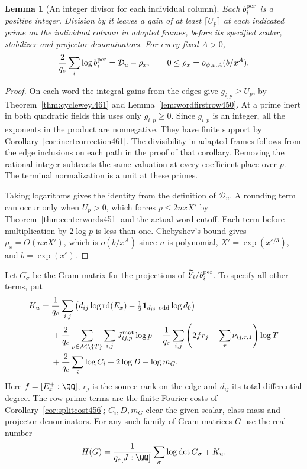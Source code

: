 \documentclass[a4paper,11pt]{article}
\newtheorem{lemma}[proposition]{Lemma}
\theoremstyle{definition}
\theoremstyle{remark}
\numberwithin{equation}{section}
\begin{document}
\begin{lemma}[An integer divisor for each individual column]\leavevmode
\label{lem:periodinteger463}
Each \(b_i^{\rm per}\) is a positive integer. Division by it
leaves a gain of at least \(\lceil U_p\rceil\) at each indicated
prime on the individual column in adapted frames, before its
specified scalar, stabilizer and projector denominators.
For every fixed \(A>0\),
\[
       \frac2{q_c}\sum_i\log b_i^{\rm per}
                    =\mathcal D_u-\rho_x,\qquad
       0\le\rho_x=o_{\psi,\varepsilon,A}(b/x^A).
\]
\end{lemma}
\begin{proof}
On each word the integral gains from the edges give
\(g_{i,p}\ge U_p\), by
Theorem~\ref{thm:cycleweyl461} and
Lemma~\ref{lem:wordfirstrow450}. At a prime inert in both
quadratic fields this uses only \(g_{i,p}\ge0\). Since
\(g_{i,p}\) is an integer, all the exponents in the product
are nonnegative. They have finite support by
Corollary~\ref{cor:inertcorrection461}. The divisibility in
adapted frames follows from the edge inclusions on each path
in the proof of that corollary. Removing the rational integer
subtracts the same valuation at every coefficient place over
\(p\). The terminal normalization is a unit at these primes.

Taking logarithms gives the identity from the definition of
\(\mathcal D_u\). A rounding term can occur only when \(U_p>0\),
which forces \(p\le2nxX'\) by Theorem~\ref{thm:centerwords451}
and the actual word cutoff. Each term before multiplication by
\(2\log p\) is less than one. Chebyshev's bound gives
\(\rho_x=O(nxX')\), which is \(o(b/x^A)\) since \(n\) is
polynomial, \(X'=\exp(x^{\varepsilon/3})\), and
\(b=\exp(x^\varepsilon)\).
\end{proof}

Let \(G^\circ_\sigma\) be the Gram matrix for the projections
of \(\widetilde Y_i/b_i^{\rm per}\). To specify all other terms,
put
\[
\begin{aligned}
 K_u={}&\frac1{q_c}\sum_{i,j}
  \left(d_{ij}\log\operatorname{rd}(E_x)
       -\tfrac12{\bf1}_{d_{ij}\ {\rm odd}}\log d_0\right)\\
 &+\frac2{q_c}\sum_{p\in\mathcal M\setminus\{T\}}
                   \sum_{i,j} J^{\rm mat}_{ij,p}\log p
  +\frac1{q_c}\sum_{i,j}
       \left(2fr_j+\sum_\tau\nu_{ij,\tau,1}\right)\log T\\
 &+\frac2{q_c}\sum_i\log C_i+2\log D+\log m_G .
\end{aligned}
\]
Here \(f=[E_x^+:\QQ]\), \(r_j\) is the source rank on the
edge and \(d_{ij}\) its total differential degree.
The row-prime terms are the finite Fourier costs of
Corollary~\ref{cor:splitcost456}; \(C_i,D,m_G\) clear the given
scalar, class mass and projector denominators. For any
such family of Gram matrices \(G\) use the real number
\[
            H(G)=\frac{1}{q_c[J:\QQ]}\sum_\sigma\log\det G_\sigma
                      +K_u .
\]
\end{document}

